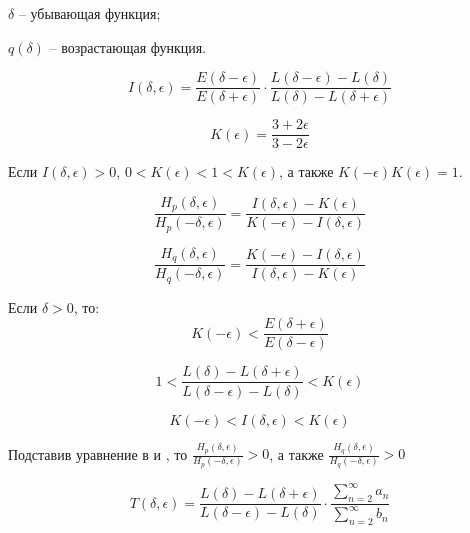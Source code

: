 $\delta$ -- убывающая функция;

$q(\delta)$ -- возрастающая функция.

\begin{equation}
\label{eq:equation95}
I(\delta, \epsilon) = \frac{E(\delta - \epsilon)}{E(\delta + \epsilon)} \cdot \frac{L(\delta - \epsilon) - L(\delta)}{L(\delta) - L(\delta + \epsilon)}
\end{equation}

\begin{equation}
\label{eq:equation96}
K(\epsilon) = \frac{3 + 2\epsilon}{3 - 2\epsilon}
\end{equation}

Если $I(\delta, \epsilon) > 0$, $0 < K(\epsilon) < 1 < K (\epsilon)$, а также $K(- \epsilon)K(\epsilon) = 1$.

\begin{equation}
\label{eq:equation97}
\frac{H_{p}(\delta, \epsilon)}{H_{p}(- \delta, \epsilon)} = \frac{I(\delta, \epsilon) - K(\epsilon)}{K(- \epsilon) - I(\delta, \epsilon)}
\end{equation}
 
\begin{equation}
\label{eq:equation98}
\frac{H_{q}(\delta, \epsilon)}{H_{q}(- \delta, \epsilon)} = \frac{K(- \epsilon) -  I(\delta, \epsilon)}{I(\delta, \epsilon) - K(\epsilon)}
\end{equation}

Если $\delta > 0$, то:
\begin{equation}
\label{eq:equation99}
K(- \epsilon) < \frac{E(\delta + \epsilon)}{E(\delta - \epsilon)}
\end{equation}

\begin{equation}
\label{eq:equation100}
1 < \frac{L(\delta) - L(\delta + \epsilon)}{L(\delta - \epsilon) - L(\delta)} < K(\epsilon)
\end{equation}

\begin{equation}
\label{eq:equation101}
K(- \epsilon) < I(\delta, \epsilon) < K(\epsilon)
\end{equation}

Подставив уравнение  в   и  , то $\frac{H_{p}(\delta, \epsilon)}{H_{p}(- \delta, \epsilon)} > 0$, а также $\frac{H_{q}(\delta, \epsilon)}{H_{q}(- \delta, \epsilon)} > 0$

\begin{equation}
\label{eq:equation102}
T(\delta,  \epsilon) = \frac{L(\delta) - L(\delta + \epsilon)}{L(\delta - \epsilon) - L(\delta)} \cdot \frac{ \sum_{n = 2}^{\infty} a_{n}}{\sum_{n = 2}^{\infty} b_{n}}
\end{equation}

